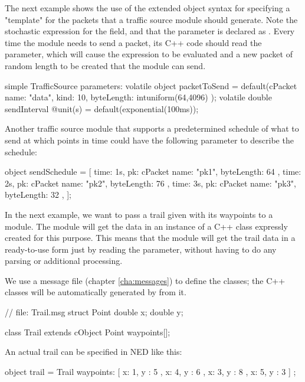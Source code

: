 The next example shows the use of the extended object syntax for specifying a
"template" for the packets that a traffic source module should generate. Note
the stochastic expression for the  field, and that the parameter
is declared as . Every time the module needs to send a
packet, its C++ code should read the  parameter, which will
cause the expression to be evaluated and a new packet of random length to be
created that the module can send.

\begin{ned}
simple TrafficSource {
    parameters:
    volatile object packetToSend = default(cPacket {
        name: "data",
        kind: 10,
        byteLength: intuniform(64,4096)
    });
    volatile double sendInterval @unit(s) = default(exponential(100ms));
}
\end{ned}

Another traffic source module that supports a predetermined schedule of what to
send at which points in time could have the following parameter to describe the
schedule:

\begin{ned}
object sendSchedule = [
    { time: 1s, pk: cPacket { name: "pk1", byteLength: 64 } },
    { time: 2s, pk: cPacket { name: "pk2", byteLength: 76 } },
    { time: 3s, pk: cPacket { name: "pk3", byteLength: 32 } },
];
\end{ned}

In the next example, we want to pass a trail given with its waypoints to a
module. The module will get the data in an instance of a  C++ class
expressly created for this purpose. This means that the module will get the
trail data in a ready-to-use form just by reading the parameter, without having
to do any parsing or additional processing.

We use a message file (chapter \ref{cha:messages}) to define the classes; the
C++ classes will be automatically generated by {\opp} from it.

\begin{msg}
// file: Trail.msg
struct Point {
    double x;
    double y;
}

class Trail extends cObject {
    Point waypoints[];
}
\end{msg}

An actual trail can be specified in NED like this:

\begin{ned}
object trail = Trail {
    waypoints: [
        { x: 1, y : 5 },
        { x: 4, y : 6 },
        { x: 3, y : 8 },
        { x: 5, y : 3 }
    ]
  };
\end{ned}

